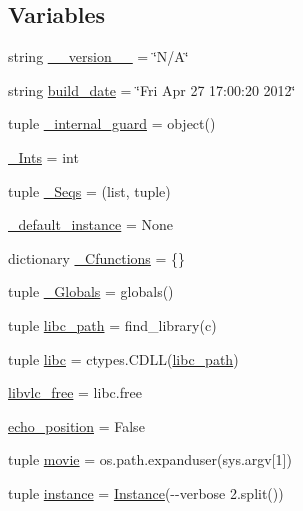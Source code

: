 \subsection*{Variables}
\begin{DoxyCompactItemize}
\item 
string \hyperlink{namespacesrc_1_1lib_1_1vlc_a46ff47a37653acbaae0025e746631f83}{\+\_\+\+\_\+version\+\_\+\+\_\+} = \char`\"{}N/A\char`\"{}
\item 
string \hyperlink{namespacesrc_1_1lib_1_1vlc_a2984141e3f9ed00c9434c99a3e7bb178}{build\+\_\+date} = \char`\"{}Fri Apr 27 17\+:00\+:20 2012\char`\"{}
\item 
tuple \hyperlink{namespacesrc_1_1lib_1_1vlc_aa20040a53d2ed3a0579dd029a9300320}{\+\_\+internal\+\_\+guard} = object()
\item 
\hyperlink{namespacesrc_1_1lib_1_1vlc_a6c7026f38c337af620b7f4b543da739f}{\+\_\+\+Ints} = int
\item 
tuple \hyperlink{namespacesrc_1_1lib_1_1vlc_a87bd402c7a97b5eea5744a14f949ca96}{\+\_\+\+Seqs} = (list, tuple)
\item 
\hyperlink{namespacesrc_1_1lib_1_1vlc_af194acaa28d95d95d2e2e581842216ab}{\+\_\+default\+\_\+instance} = None
\item 
dictionary \hyperlink{namespacesrc_1_1lib_1_1vlc_a09fa8c990541a8d6b45c8d7dbed17a47}{\+\_\+\+Cfunctions} = \{\}
\item 
tuple \hyperlink{namespacesrc_1_1lib_1_1vlc_a6838f72f2373c5b785790c8d6556f2e8}{\+\_\+\+Globals} = globals()
\item 
tuple \hyperlink{namespacesrc_1_1lib_1_1vlc_a0b02a384aff2a608ba94b4c351017c31}{libc\+\_\+path} = find\+\_\+library(\textquotesingle{}c\textquotesingle{})
\item 
tuple \hyperlink{namespacesrc_1_1lib_1_1vlc_a0e3abf116434381009146b4b6f13bd88}{libc} = ctypes.\+C\+D\+L\+L(\hyperlink{namespacesrc_1_1lib_1_1vlc_a0b02a384aff2a608ba94b4c351017c31}{libc\+\_\+path})
\item 
\hyperlink{namespacesrc_1_1lib_1_1vlc_ac5c23a969b0c59dabc7a2ea0860ebaab}{libvlc\+\_\+free} = libc.\+free
\item 
\hyperlink{namespacesrc_1_1lib_1_1vlc_a88ac1021d884b74f9578ec7be48d7cad}{echo\+\_\+position} = False
\item 
tuple \hyperlink{namespacesrc_1_1lib_1_1vlc_acb04cca35b5c624c7ec2df52c6b7efdd}{movie} = os.\+path.\+expanduser(sys.\+argv\mbox{[}1\mbox{]})
\item 
tuple \hyperlink{namespacesrc_1_1lib_1_1vlc_a34527395ebcccc291766742d4ad044c8}{instance} = \hyperlink{classsrc_1_1lib_1_1vlc_1_1Instance}{Instance}(\textquotesingle{}-\/-\/verbose 2\textquotesingle{}.split())

\end{DoxyCompactItemize}
